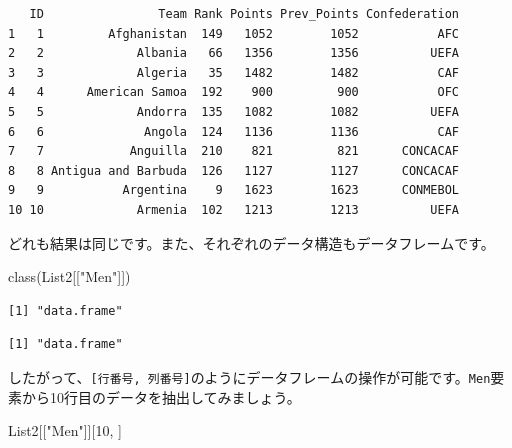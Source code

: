 \documentclass[
  a4paper,
  pandoc,
  ja=standard,
  jafont=haranoaji]{bxjsbook}
\newenvironment{Shaded}{\begin{snugshade}}{\end{snugshade}}
\newcommand{\DecValTok}[1]{\textcolor[rgb]{0.68,0.00,0.00}{#1}}
\newcommand{\FunctionTok}[1]{\textcolor[rgb]{0.28,0.35,0.67}{#1}}
\newcommand{\NormalTok}[1]{\textcolor[rgb]{0.00,0.48,0.65}{#1}}
\newcommand{\SpecialCharTok}[1]{\textcolor[rgb]{0.37,0.37,0.37}{#1}}
\newcommand{\StringTok}[1]{\textcolor[rgb]{0.13,0.47,0.30}{#1}}
\begin{document}
\begin{Shaded}
\end{Shaded}

\begin{verbatim}
   ID                Team Rank Points Prev_Points Confederation
1   1         Afghanistan  149   1052        1052           AFC
2   2             Albania   66   1356        1356          UEFA
3   3             Algeria   35   1482        1482           CAF
4   4      American Samoa  192    900         900           OFC
5   5             Andorra  135   1082        1082          UEFA
6   6              Angola  124   1136        1136           CAF
7   7            Anguilla  210    821         821      CONCACAF
8   8 Antigua and Barbuda  126   1127        1127      CONCACAF
9   9           Argentina    9   1623        1623      CONMEBOL
10 10             Armenia  102   1213        1213          UEFA
\end{verbatim}

どれも結果は同じです。また、それぞれのデータ構造もデータフレームです。

\begin{Shaded}
\begin{Highlighting}[numbers=left,,]
\FunctionTok{class}\NormalTok{(List2[[}\StringTok{"Men"}\NormalTok{]])}
\end{Highlighting}
\end{Shaded}

\begin{verbatim}
[1] "data.frame"
\end{verbatim}

\begin{Shaded}
\end{Shaded}

\begin{verbatim}
[1] "data.frame"
\end{verbatim}

したがって、\texttt{{[}行番号,\ 列番号{]}}のようにデータフレームの操作が可能です。\texttt{Men}要素から10行目のデータを抽出してみましょう。

\begin{Shaded}
\begin{Highlighting}[numbers=left,,]
\NormalTok{List2[[}\StringTok{"Men"}\NormalTok{]][}\DecValTok{10}\NormalTok{, ]}
\end{Highlighting}
\end{Shaded}
\end{document}
